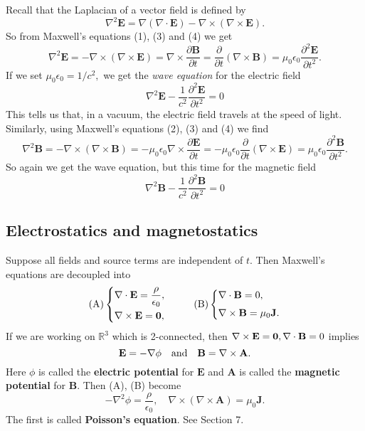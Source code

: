 Recall that the Laplacian of a vector field is defined by
\[
    \nabla^{2} \mathbf{E}=\nabla(\nabla \cdot \mathbf{E})-\nabla \times(\nabla \times \mathbf{E}).
\]
So from Maxwell's equations (1), (3) and (4) we get
\[
    \nabla^{2} \mathbf{E}=-\nabla \times(\nabla \times \mathbf{E})=\nabla \times \frac{\partial \mathbf{B}}{\partial t}=\frac{\partial}{\partial t}(\nabla \times \mathbf{B})=\mu_{0} \epsilon_{0} \frac{\partial^{2} \mathbf{E}}{\partial t^{2}}.
\]
If we set $\mu_{0} \epsilon_{0}=1 / c^{2},$ we get the \textit{wave equation} for the electric field
\[
    \boxed{\nabla^{2} \mathbf{E}-\frac{1}{c^{2}} \frac{\partial^{2} \mathbf{E}}{\partial t^{2}}=0}
\]
This tells us that, in a vacuum, the electric field travels at the speed of light. Similarly, using Maxwell's equations (2), (3) and (4) we find
\[
    \nabla^{2} \mathbf{B}=-\nabla \times(\nabla \times \mathbf{B})=-\mu_{0} \epsilon_{0} \nabla \times \frac{\partial \mathbf{E}}{\partial t}=-\mu_{0} \epsilon_{0} \frac{\partial}{\partial t}(\nabla \times \mathbf{E})=\mu_{0} \epsilon_{0} \frac{\partial^{2} \mathbf{B}}{\partial t^{2}}.
\]
So again we get the wave equation, but this time for the magnetic field
\[
    \boxed{\nabla^{2} \mathbf{B}-\frac{1}{c^{2}} \frac{\partial^{2} \mathbf{B}}{\partial t^{2}}=0}
\]

\subsection{Electrostatics and magnetostatics}
Suppose all fields and source terms are independent of $t$. Then Maxwell's equations are decoupled into 
\[
    (\text{A})\left\{ \begin{aligned}
         &\nabla\cdot\mathbf{E} = \frac{\rho}{\epsilon_0},\\ 
         &\nabla\times\mathbf{E} = \mathbf{0},
    \end{aligned} \right. ~~~~~~~~ (\text{B})\left\{ \begin{aligned}
        &\nabla\cdot\mathbf{B} = 0,\\[3pt]
        &\nabla\times\mathbf{B} = \mu_0\mathbf{J}.
   \end{aligned} \right.
\]
If we are working on $ \mathbb{R}^{3} $ which is 2-connected, then $ \nabla\times\mathbf{E} = \mathbf{0},\nabla\cdot\mathbf{B}=0 $ implies 
\[
    \mathbf{E} = - \nabla\phi\quad \text{and}\quad \mathbf{B} = \nabla\times\mathbf{A}.
\]
Here $ \phi $ is called the \textbf{electric potential} for $\mathbf{E}$ and $ \mathbf{A} $ is called the \textbf{magnetic potential} for $ \mathbf{B} $. Then (A), (B) become
\[
    -\nabla^{2} \phi=\frac{\rho}{\epsilon_{0}}, \quad \nabla \times(\nabla \times \mathbf{A})=\mu_{0} \mathbf{J}.
\]
The first is called \textbf{Poisson's equation}. See Section 7.

